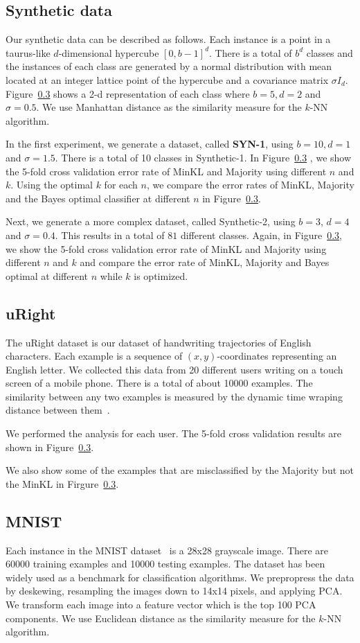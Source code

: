 \documentclass{article}
\begin{document}
\subsection{Synthetic data}
Our synthetic data can be described as follows. Each instance is a
point in a taurus-like $d$-dimensional hypercube $[0,b-1]^d$. There is
a total of $b^d$ classes and the instances of each class are generated
by a normal distribution with mean located at an integer lattice point
of the hypercube and a covariance matrix $\sigma I_d$. Figure~\ref{}
shows a 2-d representation of each class where $b=5, d= 2$ and $\sigma
= 0.5$. We use Manhattan distance as the similarity measure for the
$k$-NN algorithm.

In the first experiment, we generate a dataset, called \textbf{SYN-1},
using $b=10, d=1$ and $\sigma=1.5$. There is a total of 10 classes in
Synthetic-1. In Figure~\ref{} , we show the 5-fold cross validation
error rate of MinKL and Majority using different $n$ and $k$. Using
the optimal $k$ for each $n$, we compare the error rates of MinKL,
Majority and the Bayes optimal classifier at different $n$ in
Figure~\ref{}. 


Next, we generate a more complex dataset, called Synthetic-2, using
$b=3$, $d=4$ and $\sigma=0.4$. This results in a total of $81$ different
classes. Again, in Figure~\ref{}, we show the 5-fold cross validation
error rate of MinKL and Majority using different $n$ and $k$ and
compare the error rate of MinKL, Majority and Bayes optimal at
different $n$ while $k$ is optimized.


\subsection{uRight}
The uRight dataset is our dataset of handwriting trajectories of
English characters. Each example is a sequence of $(x,y)$-coordinates
representing an English letter. We collected this data from 20
different users writing on a touch screen of a mobile phone. There is
a total of about 10000 examples. The similarity between any two
examples is measured by the dynamic time wraping distance between
them~\cite{}.

We performed the analysis for each user. The 5-fold cross validation
results are shown in Figure~\ref{}.

We also show some of the examples that are misclassified by the
Majority but not the MinKL in Firgure~\ref{}.


\subsection{MNIST}
Each instance in the MNIST dataset~\cite{} is a 28x28 grayscale image. There
are 60000 training examples and 10000 testing examples. The dataset
has been widely used as a benchmark for classification algorithms. We
prepropress the data by deskewing, resampling the images down to
14x14 pixels, and applying PCA. We transform each image into a feature
vector which is the top 100 PCA components. We use Euclidean distance
as the similarity measure for the $k$-NN algorithm.
\end{document}
